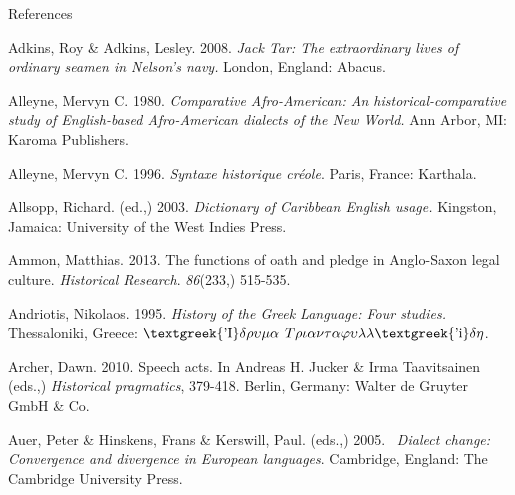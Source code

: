 \clearpage\begin{styleStandard}
References
\end{styleStandard}


\begin{styleStandard}
Adkins, Roy \& Adkins, Lesley. 2008. \textit{Jack Tar: The extraordinary lives of ordinary seamen in Nelson’s navy. }London, England: Abacus.
\end{styleStandard}


\begin{styleStandard}
Alleyne, Mervyn C. 1980. \textit{Comparative Afro-American: An historical-comparative study of English-based Afro-American dialects of the New World. }Ann Arbor, MI: Karoma Publishers.
\end{styleStandard}


\begin{styleStandard}
Alleyne, Mervyn C. 1996. \textit{Syntaxe historique cr\'{e}ole}. Paris, France: Karthala.
\end{styleStandard}


\begin{styleStandard}
Allsopp, Richard. (ed.,) 2003. \textit{Dictionary of Caribbean English usage. }Kingston, Jamaica: University of the West Indies Press.
\end{styleStandard}


\begin{styleStandard}
Ammon, Matthias. 2013. The functions of oath and pledge in Anglo-Saxon legal culture. \textit{Historical Research}. \textit{86}(233,) 515-535.
\end{styleStandard}


\begin{styleStandard}
Andriotis, Nikolaos. 1995. \textit{History of the Greek Language: Four studies.} Thessaloniki, Greece: $\text{\textgreek{'I}}\delta \rho \upsilon \mu \alpha $ $T\rho \iota \alpha \nu \tau \alpha \varphi \upsilon \lambda \lambda \text{\textgreek{'i}}\delta \eta $.
\end{styleStandard}


\begin{styleStandard}
Archer, Dawn. 2010. Speech acts. In Andreas H. Jucker \& Irma Taavitsainen (eds.,) \textit{Historical pragmatics}, 379-418. Berlin, Germany: Walter de Gruyter GmbH \& Co.
\end{styleStandard}


\begin{styleStandard}
Auer, Peter \& Hinskens, Frans \& Kerswill, Paul. (eds.,) 2005. \ \textit{Dialect change: Convergence and divergence in European languages}. Cambridge, England: The Cambridge University Press. 
\end{styleStandard}


